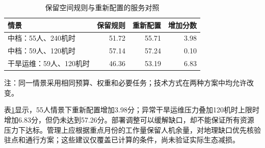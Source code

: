 \documentclass[UTF8,fontset=fandol,12pt,a4paper]{ctexart}
\begin{document}
\begin{table}[htbp]
\centering\small
\caption{保留空间规则与重新配置的服务对照}
\label{tab:adaptation}
\begin{tabular}{lrrr}
\toprule
情景 & 保留规则 & 重新配置 & 增加分数 \\
\midrule
中档：55人、240机时 & 51.72 & 55.71 & 3.98 \\
中档：59人、120机时 & 57.14 & 57.24 & 0.10 \\
干旱运维：59人、120机时 & 46.36 & 53.19 & 6.83 \\
\bottomrule
\end{tabular}
\par\smallskip\begin{minipage}{\linewidth}\footnotesize 注：同一情景采用相同预算、权重和必要任务；技术方式在两种方案中均允许改变。\end{minipage}
\end{table}

表\ref{tab:adaptation}显示，55人情景下重新配置增加3.98分；异常干旱运维压力叠加120机时上限时增加6.83分，但仍未达到57.26分。部署调整可以缓解缺口，却不能保证所有资源压力下达标。管理上应根据重点月份的工作量保留人机余量，对地理缺口优先核验驻点和通行方案；这些建议仅覆盖已计算的条件，尚未验证实际生态减损。
\end{document}
